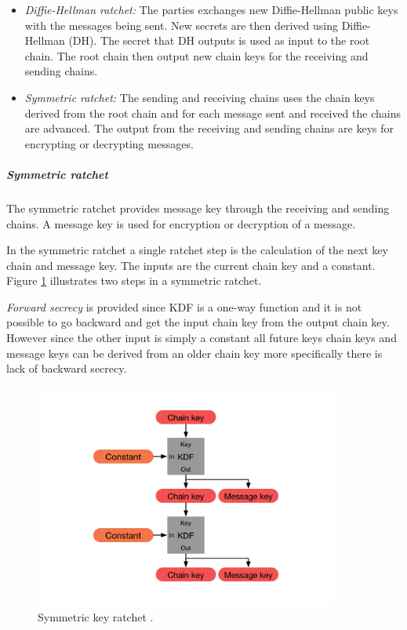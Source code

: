 \begin{itemize}
	\item \emph{Diffie-Hellman ratchet:} The parties exchanges new Diffie-Hellman public keys with the messages being sent. New secrets are then derived using Diffie-Hellman (DH). The secret that DH outputs is used as input to the root chain. The root chain then output new chain keys for the receiving and sending chains. 
	
	\item \emph{Symmetric ratchet:} The sending and receiving chains uses the chain keys derived from the root chain and for each message sent and received the chains are advanced. The output from the receiving and sending chains are keys for encrypting or decrypting messages. 
\end{itemize}


\subparagraph{Symmetric ratchet}
The symmetric ratchet provides message key through the receiving and sending chains. A message key is used for encryption or decryption of a message.

In the symmetric ratchet a single ratchet step is the calculation of the next key chain and message key. The inputs are the current chain key and a constant. Figure \ref{fig:symkeyratchet} illustrates two steps in a symmetric ratchet.

\emph{Forward secrecy} is provided since KDF is a one-way function and it is not possible to go backward and get the input chain key from the output chain key. However since the other input is simply a constant all future keys chain keys and message keys can be derived from an older chain key more specifically there is lack of backward secrecy.


\begin{figure}[H]
	\centering
	\includegraphics[width=10cm]{figures/symmetrickeyratchet.png}
	\caption{Symmetric key ratchet \cite{doubleratchet}.}
	\label{fig:symkeyratchet}
\end{figure}


